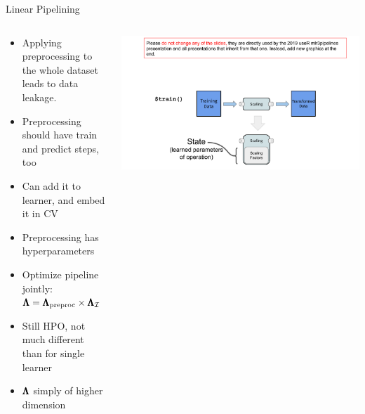 \begin{frame}{Linear Pipelining}




  \begin{columns}
    \begin{column}{0.5\textwidth}
    \begin{itemize}
      \item Applying preprocessing to the whole dataset leads to data leakage.
      \item Preprocessing should have train and predict steps, too
      \item Can add it to learner, and embed it in CV    
      \item Preprocessing has hyperparameters 
      \item Optimize pipeline jointly: $\pmb{\Lambda} = \pmb{\Lambda}_{\text{preproc}} \times \pmb{\Lambda}_{\mathcal{I}}$ 
      \item Still HPO, not much different than for single learner
      \item $\pmb{\Lambda}$ simply of higher dimension
    \end{itemize}
    \end{column}%
    \begin{column}{0.5\textwidth}
      \begin{center}
        \includegraphics[page=19, width=\textwidth, trim=20 60 30 35, clip]{images/mlr3Pipelines_graphics}
      \end{center}
    \end{column}
  \end{columns}

\end{frame}

